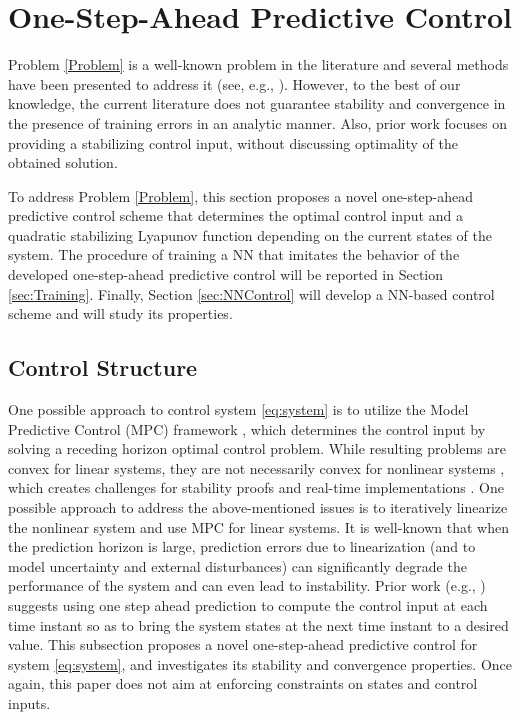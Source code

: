 \documentclass[1p,times]{elsarticle}
\begin{document}
\section{One-Step-Ahead Predictive Control}\label{sec:Solution}

Problem \ref{Problem} is a well-known problem in the literature and several methods have been presented to address it (see, e.g., \cite{dai2021lyapunov,jang2022dnlc,autenrieb2019development}). However, to the best of our knowledge, the current literature does not guarantee stability and convergence in the presence of training errors in an analytic manner. Also, prior work focuses on providing a stabilizing control input, without discussing optimality of the obtained solution. 


To address Problem \ref{Problem}, this section proposes a novel one-step-ahead predictive control scheme that determines the optimal control input and a quadratic stabilizing Lyapunov function depending on the current states of the system. The procedure of training a NN that imitates the behavior of the developed one-step-ahead predictive control will be reported in Section \ref{sec:Training}. Finally, Section \ref{sec:NNControl} will develop a NN-based control scheme and will study its properties. 






\subsection{Control Structure}\label{AA}
One possible approach to control system \eqref{eq:system} is to utilize the Model Predictive Control (MPC) framework \cite{camacho2007model,rawlings2017model}, which determines the control input by solving a receding horizon optimal control problem. While resulting problems are convex for linear systems, they are not necessarily convex for nonlinear systems \cite{Rawlings1994,Grune2011}, which creates challenges for stability proofs \cite{Allgower2000} and real-time implementations \cite{Hosseinzadeh2023RobustTermination}. One possible approach to address the above-mentioned issues is to iteratively linearize the nonlinear system and use MPC for linear systems. {{\color{blue}}It is well-known that \cite{Yin2015,HosseinzadehCANE} when the prediction horizon is large, prediction errors due to linearization (and to model uncertainty and external disturbances) can significantly degrade the performance of the system and can even lead to instability.} Prior work (e.g., \cite{Kambhampati2000}) suggests using one step ahead prediction to compute the control input at each time instant so as to bring the system states at the next time instant to a desired value. This subsection proposes a novel one-step-ahead predictive control for system \eqref{eq:system}, and investigates its stability and convergence properties. Once again, this paper does not aim at enforcing constraints on states and control inputs. 
\end{document}
